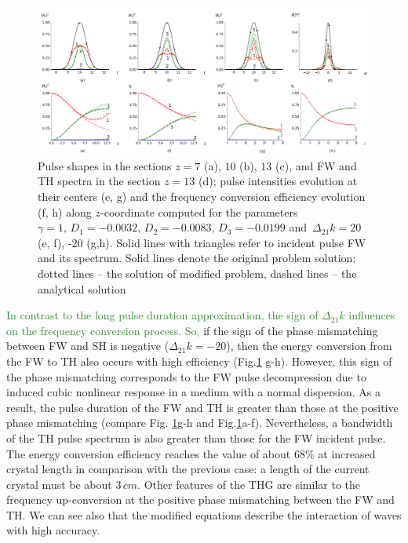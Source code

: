 \documentclass[a4paper, 12pt, onecolumn]{extarticle}
\begin{document}
\begin{figure}[h!] 
\centering 
\includegraphics[width=\linewidth]{Cascade1_1-2}  
\caption{Pulse shapes in the sections \(z=7\) (a), \(10\) (b), \(13\) (c), and FW and TH spectra in the section \(z=13\) (d); pulse intensities evolution at their centers (e, g) and the frequency conversion efficiency evolution (f, h) along \(z\)-coordinate computed for the parameters $\gamma=1,\,  D_1=-0.0032,\, D_2=-0.0083,\, D_3=-0.0199$ and \,$\Delta_{21} k=20$ (e, f), -20 (g,h). Solid lines with triangles refer to incident pulse FW and its spectrum. Solid lines denote the original   problem solution; dotted lines --  the solution of modified problem, dashed lines -- the analytical solution} 
\label{fr:c1_1}
\end{figure}

\textcolor{ForestGreen}{In contrast to the long pulse duration approximation, the sign of $\Delta_{21}k$ influences on the frequency conversion process. So, } if the sign of the phase mismatching between FW and SH is negative (\(\Delta_{21}k=-20\)), then the energy conversion from the FW to TH also occurs with high efficiency (Fig.\ref{fr:c1_1} g-h). However, this sign of the phase mismatching corresponds to the FW pulse decompression due to induced cubic nonlinear response in a medium with a normal dispersion. As a result, the pulse duration of the FW and TH is greater than those at the positive phase mismatching (compare Fig. \ref{fr:c1_1}g-h and Fig.\ref{fr:c1_1}a-f). Nevertheless, a bandwidth of the TH pulse spectrum is also greater than those for the FW incident pulse. The energy conversion efficiency reaches the value of about \(68\%\) at increased crystal length in comparison with the previous case: a length of the current crystal  must be about \(3\,cm\). Other features of the THG are similar to the frequency up-conversion at the positive phase mismatching between the FW and TH. We can see also that the modified equations describe the interaction of waves with high accuracy.
\end{document}
